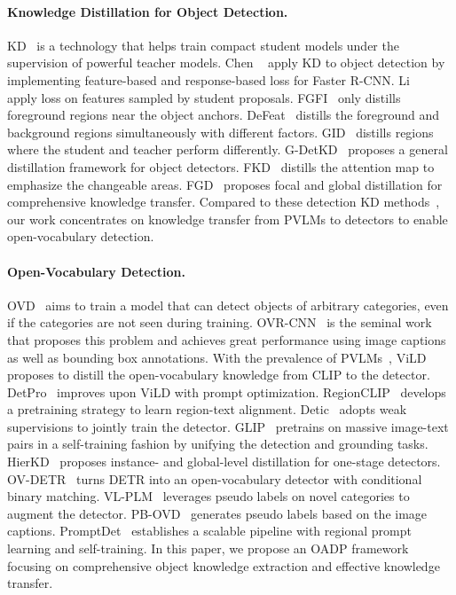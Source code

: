 \documentclass[10pt,twocolumn,letterpaper]{article}
\begin{document}
\paragraph{Knowledge Distillation for Object Detection.}
KD~\cite{kd, fitnets} is a technology that helps train compact student models under the supervision of powerful teacher models.
Chen \etal~\cite{detection_kd} apply KD to object detection by implementing feature-based and response-based loss for Faster R-CNN.
Li \etal~\cite{mimic} apply  loss on features sampled by student proposals.
FGFI~\cite{fgfi} only distills foreground regions near the object anchors.
DeFeat~\cite{defeat} distills the foreground and background regions simultaneously with different factors.
GID~\cite{gid} distills regions where the student and teacher perform differently.
G-DetKD~\cite{gdetkd} proposes a general distillation framework for object detectors.
FKD~\cite{fkd} distills the attention map to emphasize the changeable areas.
FGD~\cite{fgd} proposes focal and global distillation for comprehensive knowledge transfer.
Compared to these detection KD methods~\cite{mgd, takd, frs, lgd, icd}, our work concentrates on knowledge transfer from PVLMs to detectors to enable open-vocabulary detection.

\paragraph{Open-Vocabulary Detection.}
OVD~\cite{owl_vit, mdetr, x_detr, detclip} aims to train a model that can detect objects of arbitrary categories, even if the categories are not seen during training.
OVR-CNN~\cite{ovr_cnn} is the seminal work that proposes this problem and achieves great performance using image captions as well as bounding box annotations.
With the prevalence of PVLMs~\cite{clip, align}, ViLD~\cite{vild} proposes to distill the open-vocabulary knowledge from CLIP to the detector.
DetPro~\cite{detpro} improves upon ViLD with prompt optimization.
RegionCLIP~\cite{regionclip} develops a pretraining strategy to learn region-text alignment.
Detic~\cite{detic} adopts weak supervisions to jointly train the detector.
GLIP~\cite{glip} pretrains on massive image-text pairs in a self-training fashion by unifying the detection and grounding tasks.
HierKD~\cite{hierkd} proposes instance- and global-level distillation for one-stage detectors.
OV-DETR~\cite{ov_detr} turns DETR into an open-vocabulary detector with conditional binary matching.
VL-PLM~\cite{vl_plm} leverages pseudo labels on novel categories to augment the detector.
PB-OVD~\cite{pb_ovd} generates pseudo labels based on the image captions.
PromptDet~\cite{promptdet} establishes a scalable pipeline with regional prompt learning and self-training.
In this paper, we propose an OADP framework focusing on comprehensive object knowledge extraction and effective knowledge transfer.
 
\end{document}
